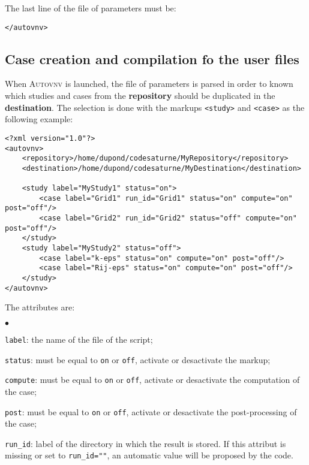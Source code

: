 \documentclass[a4paper,10pt,twoside]{csshortdoc}
\begin{document}
The last line of the file of parameters must be:

\small
\begin{verbatim}
</autovnv>
\end{verbatim}
\normalsize

\subsection{Case creation and compilation fo the user files}

When \textsc{Autovnv} is launched, the file of parameters is parsed in order to
known which studies and cases from the \textbf{repository} should be duplicated
in the \textbf{destination}. The selection is done with the markups
\texttt{<study>} and \texttt{<case>} as the following example:

\small
\begin{verbatim}
<?xml version="1.0"?>
<autovnv>
    <repository>/home/dupond/codesaturne/MyRepository</repository>
    <destination>/home/dupond/codesaturne/MyDestination</destination>

    <study label="MyStudy1" status="on">
        <case label="Grid1" run_id="Grid1" status="on" compute="on" post="off"/>
        <case label="Grid2" run_id="Grid2" status="off" compute="on" post="off"/>
    </study>
    <study label="MyStudy2" status="off">
        <case label="k-eps" status="on" compute="on" post="off"/>
        <case label="Rij-eps" status="on" compute="on" post="off"/>
    </study>
</autovnv>
\end{verbatim}
\normalsize

The attributes are:
\begin{list}{$\bullet$}{}
\item \texttt{label}: the name of the file of the script;
\item \texttt{status}: must be equal to \texttt{on} or \texttt{off},
activate or desactivate the markup;
\item \texttt{compute}: must be equal to \texttt{on} or \texttt{off},
activate or desactivate the computation of the case;
\item \texttt{post}: must be equal to \texttt{on} or \texttt{off},
activate or desactivate the post-processing of the case;
\item \texttt{run\_id}: label of the directory in which the result
is stored. If this attribut is missing or set to \texttt{run\_id=""}, an
automatic value will be proposed by the code.
\end{list}
\end{document}
